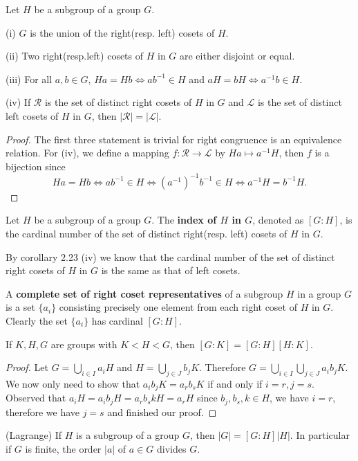 \begin{corollary}
Let $H$ be a subgroup of a group $G$.\par
(i) $G$ is the union of the right(resp. left) cosets of $H$.\par
(ii) Two right(resp.left) cosets of $H$ in $G$ are either disjoint or equal.\par
(iii) For all $a,b\in G$, $Ha=Hb\Leftrightarrow ab^{-1}\in H$ and $aH=bH\Leftrightarrow a^{-1}b\in H$.\par
(iv) If $\mathcal{R}$ is the set of distinct right cosets of $H$ in $G$ and $\mathcal{L}$ is the set of distinct left cosets of $H$ in $G$, then $|\mathcal{R}|=|\mathcal{L}|$.
\end{corollary}
\begin{proof}
The first three statement is trivial for right congruence is an equivalence relation. For (iv), we define a mapping $f:\mathcal{R}\to\mathcal{L}$ by $Ha\mapsto a^{-1}H$, then $f$ is a bijection since 
$$
Ha=Hb\Leftrightarrow ab^{-1}\in H\Leftrightarrow \left( a^{-1} \right) ^{-1}b^{-1}\in H\Leftrightarrow a^{-1}H=b^{-1}H.
$$
\end{proof}
\begin{definition}
Let $H$ be a subgroup of a group $G$. The \textbf{index of $H$ in $G$}, denoted as $[G:H]$, is the cardinal number of the set of distinct right(resp. left) cosets of $H$ in $G$.
\end{definition}
By corollary 2.23 (iv) we know that the cardinal number of the set of distinct right cosets of $H$ in $G$ is the same as that of left cosets.\par
A \textbf{complete set of right coset representatives} of a subgroup $H$ in a group $G$ is a set $\{a_i\}$ consisting precisely one element from each right coset of $H$ in $G$. Clearly the set $\{a_i\}$ has cardinal $[G:H]$.
\begin{theorem}
If $K,H,G$ are groups with $K<H<G$, then $[G:K]=[G:H][H:K]$.
\end{theorem}
\begin{proof}
Let $G=\bigcup_{i\in I}a_iH$ and $H=\bigcup_{j\in J}b_jK$. Therefore $G=\bigcup_{i\in I}\bigcup_{j\in J}a_ib_jK$. We now only need to show that $a_ib_jK=a_rb_sK$ if and only if $i=r,j=s$. Observed that $a_iH=a_ib_jH=a_rb_skH=a_rH$ since $b_j,b_s,k\in H$, we have $i=r$, therefore we have $j=s$ and finished our proof.
\end{proof}
\begin{corollary}(Lagrange)
If $H$ is a subgroup of a group $G$, then $|G|=[G:H]|H|$. In particular if $G$ is finite, the order $|a|$ of $a\in G$ divides $G$.
\end{corollary}
